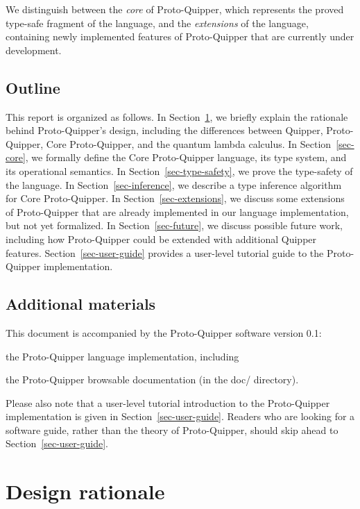 \documentclass[twoside]{article}
\begin{document}
We distinguish between the \emph{core} of Proto-Quipper, which 
represents the proved type-safe fragment of the language, and 
the \emph{extensions} of the language, containing newly 
implemented features of Proto-Quipper that are currently under 
development. 

\subsection{Outline}

This report is organized as follows. In Section~\ref{sec-design}, we
briefly explain the rationale behind Proto-Quipper's design, including
the differences between Quipper, Proto-Quipper, Core Proto-Quipper,
and the quantum lambda calculus. In Section~\ref{sec-core}, we
formally define the Core Proto-Quipper language, its type system, and
its operational semantics. In Section~\ref{sec-type-safety}, we prove
the type-safety of the language. In Section~\ref{sec-inference}, we
describe a type inference algorithm for Core Proto-Quipper. In
Section~\ref{sec-extensions}, we discuss some extensions of
Proto-Quipper that are already implemented in our language
implementation, but not yet formalized. In Section~\ref{sec-future},
we discuss possible future work, including how Proto-Quipper could be
extended with additional Quipper features.
Section~\ref{sec-user-guide} provides a user-level tutorial guide to
the Proto-Quipper implementation.

\subsection{Additional materials}

This document is accompanied by the Proto-Quipper software version
0.1:
\begin{compactitemize}
\item the Proto-Quipper language implementation, including
\item the Proto-Quipper browsable documentation (in the doc/ directory).
\end{compactitemize}

Please also note that a user-level tutorial introduction to the
Proto-Quipper implementation is given in
Section~\ref{sec-user-guide}. Readers who are looking for a software
guide, rather than the theory of Proto-Quipper, should skip ahead to
Section~\ref{sec-user-guide}.

\clearpage
\section{Design rationale}\label{sec-design}
\end{document}

